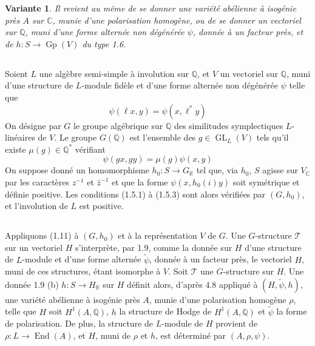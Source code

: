 \documentclass[11pt]{amsart}
\theoremstyle{plain}
\newtheorem{variante}{Variante}
\theoremstyle{definition}
\DeclareMathOperator{\End}{End}
\DeclareMathOperator{\GL}{GL}
\DeclareMathOperator{\Gp}{Gp}
\newcommand{\QQ}{\mathbb{Q}}
\newcommand{\RR}{\mathbb{R}}
\newcommand{\CC}{\mathbb{C}}
\begin{document}
\begin{variante}
Il revient au m\^eme de se donner une vari\'et\'e ab\'elienne \`a isog\'enie pr\`es $A$ sur $\CC$, munie d'une polarisation homog\`ene, ou de se donner un vectoriel sur $\QQ$, muni d'une forme altern\'ee non d\'eg\'en\'er\'ee $\psi$, donn\'ee \`a un facteur pr\`es, et de $h : S \to \Gp(V)$ du type 1.6.
\end{variante}

\subsection{}

Soient $L$ une alg\`ebre semi-simple \`a involution sur $\QQ$, et $V$ un vectoriel sur $\QQ$, muni d'une structure de $L$-module fid\`ele et d'une forme altern\'ee non d\'eg\'en\'er\'ee $\psi$ telle que
\begin{equation}\label{eq:4.9.1}
\psi(\ell x, y) = \psi(x, \ell^* y)
\end{equation}
On d\'esigne par $G$ le groupe alg\'ebrique sur $\QQ$ des similitudes symplectiques $L$-lin\'eaires de $V$. Le groupe $G(\QQ)$ est l'ensemble des $g \in \GL_L(V)$ tels qu'il existe $\mu(g) \in \QQ^*$ v\'erifiant
\begin{equation}\label{eq:4.9.2}
\psi(gx, gy) = \mu(g) \psi(x,y)
\end{equation}
On suppose donn\'e un homomorphisme $h_0 : S \to G_{\RR}$ tel que, via $h_0$, $S$ agisse sur $V_{\CC}$ par les caract\`eres $z^{-1}$ et $\bar{z}^{-1}$ et que la forme $\psi(x, h_0(i)y)$ soit sym\'etrique et d\'efinie positive. Les conditions (1.5.1) \`a (1.5.3) sont alors v\'erifi\'ees par $(G, h_0)$, et l'involution de $L$ est positive.

\subsection{}

Appliquons (1.11) \`a $(G, h_0)$ et \`a la repr\'esentation $V$ de $G$. Une $G$-structure $\mathcal{T}$ sur un vectoriel $H$ s'interpr\`ete, par 1.9, comme la donn\'ee sur $H$ d'une structure de $L$-module et d'une forme altern\'ee $\tilde{\psi}$, donn\'ee \`a un facteur pr\`es, le vectoriel $H$, muni de ces structures, \'etant isomorphe \`a $V$. Soit $\mathcal{T}$ une $G$-structure sur $H$. Une donn\'ee 1.9 (b) $h : S \to H_{\RR}$ sur $H$ d\'efinit alors, d'apr\`es 4.8 appliqu\'e \`a $(H, \tilde{\psi}, h)$, une vari\'et\'e ab\'elienne \`a isog\'enie pr\`es $A$, munie d'une polarisation homog\`ene $\rho$, telle que $H$ soit $H^1(A, \QQ)$, $h$ la structure de Hodge de $H^1(A, \QQ)$ et $\tilde{\psi}$ la forme de polarisation. De plus, la structure de $L$-module de $H$ provient de $\rho : L \to \End(A)$, et $H$, muni de $\rho$ et $h$, est d\'etermin\'e par $(A, \rho, \psi)$.
\end{document}
